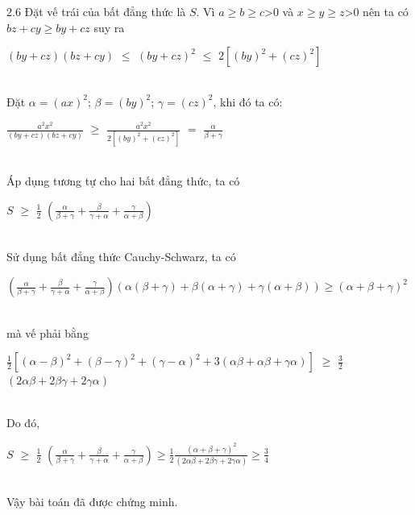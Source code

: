 \begin{Answer}{2.6}
Đặt vế trái của bất đẳng thức là $S$. Vì $a$$\geq$$b$$\geq$$c$>$0$ và $x$$\geq$$y$$\geq$$z$>$0$ nên ta có
 $bz+cy$$\geq$$by+cz$ suy ra\\
\centerline {$(by+cz)(bz+cy)$ $\leq$ $(by+cz)^2$ $\leq$ $2\left[(by)^2+(cz)^2\right]$ }\\
Đặt $\alpha$$=(ax)^2$; $\beta$$=(by)^2$; $\gamma$$=(cz)^2$, khi đó ta có:\\
\centerline {$\frac{a^2x^2}{(by+cz)(bz+cy)}$ $\geq$ $\frac{a^2x^2}{2\left[(by)^2+(cz)^2\right]}$ $=$ $\frac{\alpha}{{\beta}+
{\gamma}}$}\\
Áp dụng tương tự cho hai bất đẳng thức, ta có\\
\centerline {$S$ $\geq$ $\frac{1}{2}$ $({\frac{\alpha}{{\beta}+{\gamma}}}+{\frac{\beta}{{\gamma}+{\alpha}}}
+{\frac{\gamma}{{\alpha}+{\beta}}})$}\\
Sử dụng bất đẳng thức Cauchy-Schwarz, ta có\\
\centerline {$({\frac{\alpha}{{\beta}+{\gamma}}}+{\frac{\beta}{{\gamma}+{\alpha}}}+{\frac{\gamma}{{\alpha}
+{\beta}}})$$({\alpha}({\beta}+{\gamma})+{\beta}({\alpha}+{\gamma})+{\gamma}({\alpha}+{\beta})) {\geq} ({\alpha}
+{\beta}+{\gamma})^2$ }\\
mà vế phải bằng\\
\centerline  {    $\frac{1}{2}$$\left[({\alpha}-{\beta})^2+({\beta}-{\gamma})^2+({\gamma}-{\alpha})^2+3({\alpha}{\beta}
+{\alpha}{\beta}+{\gamma}{\alpha})\right]$ $\geq$ $\frac{3}{2}$ $(2{\alpha}{\beta}+2{\beta}{\gamma}+2{\gamma}{\alpha})$ }\\
Do đó,\\
\centerline {$S$ $\geq$ $\frac{1}{2}$
$({\frac{\alpha}{{\beta}+{\gamma}}}+{\frac{\beta}{{\gamma}+{\alpha}}}
+{\frac{\gamma}{{\alpha}+{\beta}}})\geq\frac{1}{2}\frac{({\alpha}+{\beta}+{\gamma})^2}{(2{\alpha}{\beta}+2{\beta}{\gamma}+2{\gamma}{\alpha})}\geq\frac{3}{4}$                           }\\
Vậy bài toán đã được chứng minh.
\end{Answer}
